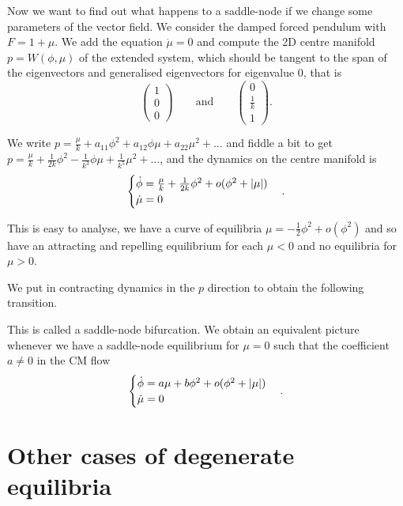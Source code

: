 \documentclass{notes}
\theoremstyle{plain}
\begin{document}
Now we want to find out what happens to a saddle-node if we change some
parameters of the vector field.  We consider the damped forced pendulum
with $F = 1+\mu$. We add the equation $\dot{\mu} = 0$ and compute the
2D centre manifold $p=W(\phi,\mu)$ of the extended system, which should
be tangent to the span of the eigenvectors and generalised eigenvectors
for eigenvalue $0$, that is
\[
\begin{pmatrix}
1 \\ 0 \\ 0
\end{pmatrix}
\qquad \text{and} \qquad
\begin{pmatrix}
0 \\ \frac{1}{k} \\ 1
\end{pmatrix}.
\]

We write $p = \frac{\mu}{k} + a_{11} \phi^2 + a_{12} \phi \mu  + a_{22} \mu^2
+ \dots$ and fiddle a bit to get
$p = \frac{\mu}{k} + \frac{1}{2 k} \phi^2 - \frac{1}{k^3} \phi \mu
+ \frac{1}{k^5} \mu^2 + \dots$, and the dynamics on the centre manifold is
\[
\begin{cases}
\dot{\phi} = \frac{\mu}{k} + \frac{1}{2 k} \phi^2 + o(\phi^2 + \left|\mu\right|) \\
\dot{\mu} = 0
\end{cases}.
\]

This is easy to analyse, we have a curve of equilibria $\mu = -\frac{1}{2}
\phi^2 + o(\phi^2)$ and so have an attracting and repelling equilibrium for
each $\mu < 0$ and no equilibria for $\mu > 0$.

\vspace{1.75in}

We put in contracting dynamics in the $p$ direction to obtain the following
transition.

\vspace{1.75in}

This is called a saddle-node bifurcation.  We obtain an equivalent picture
whenever we have a saddle-node equilibrium for $\mu = 0$ such that the
coefficient $a \neq 0$ in the CM flow
\[
\begin{cases}
\dot{\phi} = a \mu + b \phi^2 + o(\phi^2 + \left|\mu\right|) \\
\dot{\mu} = 0
\end{cases}.
\]

\section{Other cases of degenerate equilibria}
\end{document}
